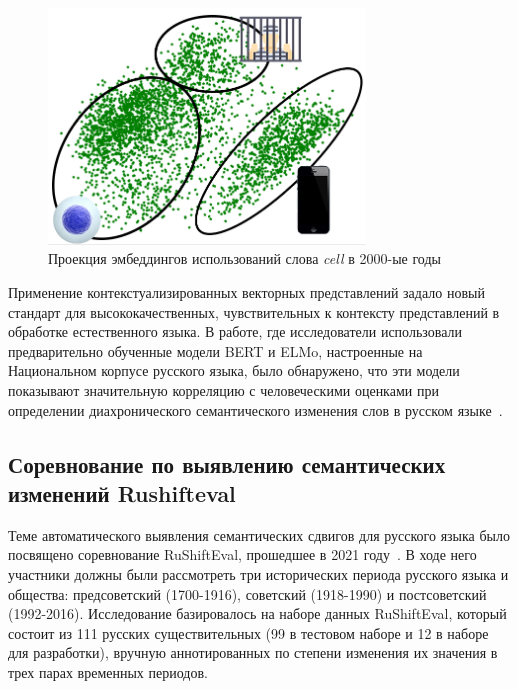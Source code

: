 \documentclass[LI,VKR]{HSEUniversity}
\begin{document}
\begin{figure}[H]
	\centering
	\includegraphics[width=0.75\textwidth]{img/theory/cell_projection_2000_photoshop}
	\caption{Проекция эмбеддингов использований слова \textit{cell} в 2000-ые годы}
	\label{fig:Контекстуальные вложения}
\end{figure}

Применение контекстуализированных векторных представлений задало новый стандарт для
высококачественных, чувствительных к контексту представлений в обработке естественного языка.
В работе, где исследователи использовали предварительно обученные модели BERT и ELMo,
настроенные на Национальном корпусе русского языка, было обнаружено,
что эти модели показывают значительную корреляцию с человеческими оценками
при определении диахронического семантического изменения слов в русском языке~\cite{rodina2020elmo}.

\subsection{Соревнование по выявлению семантических изменений Rushifteval}

Теме автоматического выявления семантических сдвигов для русского языка
было посвящено соревнование RuShiftEval, прошедшее в 2021 году~\cite{rushifteval}.
В ходе него участники должны были рассмотреть три исторических периода русского языка и общества:
предсоветский (1700-1916), советский (1918-1990) и постсоветский (1992-2016).
Исследование базировалось на наборе данных RuShiftEval, который состоит из
111 русских существительных (99 в тестовом наборе и 12 в наборе для разработки),
вручную аннотированных по степени изменения их значения в трех парах временных периодов.
\end{document}
